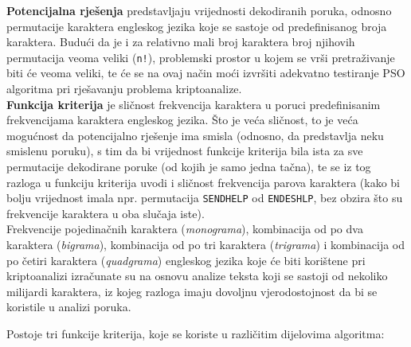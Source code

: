 \documentclass[12pt, a4paper]{article}
\begin{document}
\textbf{Potencijalna rješenja} predstavljaju vrijednosti dekodiranih poruka, odnosno permutacije karaktera engleskog jezika koje se sastoje od predefinisanog broja karaktera. Budući da je i za relativno mali broj karaktera broj njihovih permutacija veoma veliki (\texttt{n!}), problemski prostor u kojem se vrši pretraživanje biti će veoma veliki, te će se na ovaj način moći izvršiti adekvatno testiranje PSO algoritma pri rješavanju problema kriptoanalize. \\

\textbf{Funkcija kriterija} je sličnost frekvencija karaktera u poruci predefinisanim frekvencijama karaktera engleskog jezika. Što je veća sličnost, to je veća mogućnost da potencijalno rješenje ima smisla (odnosno, da predstavlja neku smislenu poruku), s tim da bi vrijednost funkcije kriterija bila ista za sve permutacije dekodirane poruke (od kojih je samo jedna tačna), te se iz tog razloga u funkciju kriterija uvodi i sličnost frekvencija parova karaktera \cite{cryptopso} (kako bi bolju vrijednost imala npr. permutacija \texttt{SENDHELP} od \texttt{ENDESHLP}, bez obzira što su frekvencije karaktera u oba slučaja iste). \\

Frekvencije pojedinačnih karaktera (\textit{monograma}), kombinacija od po dva karaktera (\textit{bigrama}), kombinacija od po tri karaktera (\textit{trigrama}) i kombinacija od po četiri karaktera (\textit{quadgrama}) engleskog jezika koje će biti korištene pri kriptoanalizi izračunate su na osnovu analize teksta koji se sastoji od nekoliko milijardi karaktera, iz kojeg razloga imaju dovoljnu vjerodostojnost da bi se koristile u analizi poruka. \cite{letters}

Postoje tri funkcije kriterija, koje se koriste u različitim dijelovima algoritma:
\end{document}
